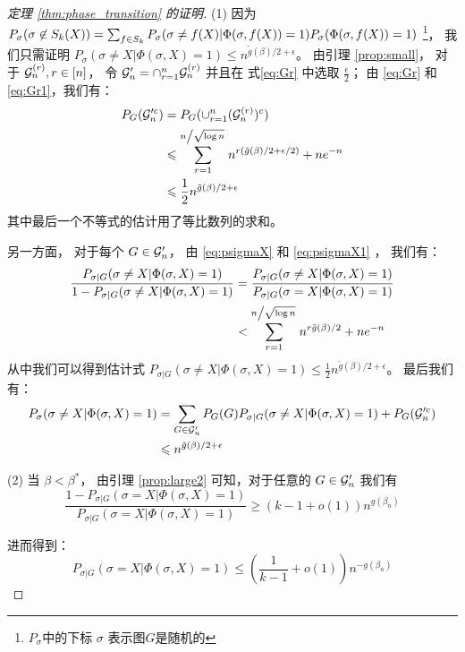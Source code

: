 \begin{proof}[定理 \ref{thm:phase_transition} 的证明]
	(1) 因为 $P_{\sigma}(\sigma \not \in S_k(X)) = \sum_{f\in S_k} P_{\sigma}(\sigma \neq f(X) | \Phi(\sigma, f(X))=1)
  \linebreak P_{\sigma}(\Phi(\sigma, f(X))=1)$
  \footnote{$P_{\sigma}$中的下标 $\sigma$ 表示图$G$是随机的}，
	我们只需证明 $P_{\sigma}(\sigma \neq X | \Phi(\sigma, X)=1) \leq  n^{\tilde{g}(\beta)/2 + \epsilon}$。
	由引理 \ref{prop:small}， 对于 $\mathcal{G}_n^{(r)}, r\in [n]$，
	令 $\mathcal{G}'_n = \cap_{r=1}^n \mathcal{G}_n^{(r)}$ 
  并且在 式\eqref{eq:Gr} 中选取 $\frac{\epsilon}{2}$；
  由 \eqref{eq:Gr} 和 \eqref{eq:Gr1}，我们有：
	\begin{align*}
	P_G(\mathcal{G}'^c_n) &= P_G(\cup_{r=1}^n (\mathcal{G}_n^{(r)})^c) \\
	&\leqslant \sum_{r=1}^{n\left/\sqrt{\log n } \right. } n^{r(\tilde{g}(\beta)/2 + \epsilon/2)}  + n e^{-n} \\
	& \leqslant \frac{1}{2} n^{\tilde{g}(\beta)/2 + \epsilon}
	\end{align*}
	其中最后一个不等式的估计用了等比数列的求和。

	另一方面， 对于每个 $G \in \mathcal{G}'_n$，
  由 \eqref{eq:psigmaX} 和 \eqref{eq:psigmaX1} ，
	我们有：
	\begin{align*}
	\frac{P_{\sigma | G}(\sigma \neq X | \Phi(\sigma, X)=1)}{1-P_{\sigma | G}(\sigma \neq X | \Phi(\sigma, X)=1)} &= \frac{P_{\sigma | G}(\sigma \neq X | \Phi(\sigma, X)=1)}{P_{\sigma|G}(\sigma=X | \Phi(\sigma, X)=1)} \\
	&< \sum_{r=1}^{n \left/\sqrt{\log n } \right.}  n^{r\tilde{g}(\beta)/2} + n e^{-n}
	\end{align*}
	从中我们可以得到估计式 $P_{\sigma | G}(\sigma \neq X | \Phi(\sigma, X)=1)\leq \frac{1}{2}n^{\tilde{g}(\beta)/2 + \epsilon}$。
	最后我们有： 
	\begin{align*}
	P_{\sigma}(\sigma \neq X|\Phi(\sigma, X)=1) &= \sum_{G\in \mathcal{G}'_n} P_G(G)P_{\sigma |G}(\sigma \neq X | \Phi(\sigma, X)=1) + P_G(\mathcal{G}'^c_n)\\	
	& \leqslant n^{\tilde{g}(\beta)/2 + \epsilon}
	\end{align*}
	
	(2) 当 $\beta < \beta^*$，
  由引理 \ref{prop:large2} 可知，对于任意的 $G \in \mathcal{G}'_n$
	我们有
	$$
	\frac{1-P_{\sigma | G}(\sigma=X | \Phi(\sigma, X)=1)}{P_{\sigma | G}(\sigma=X | \Phi(\sigma, X)=1)}\geq (k-1+o(1))n^{g(\beta_n)}
	$$
	
	进而得到：
	$$
	P_{\sigma | G}(\sigma=X| \Phi(\sigma, X)=1) \leq \left(\frac{1}{k-1}+o(1) \right) n^{-g(\beta_n)}
	$$
	

\end{proof}
